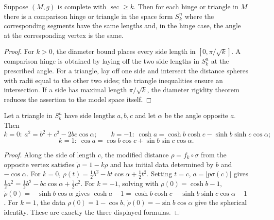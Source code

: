 \begin{lemma}
  \label{lem:pet-ch12-comparison-hinge-triangle-exist}

  Suppose $(M,g)$ is complete with $\sec\ge k$. Then for each hinge or triangle
  in $M$ there is a comparison hinge or triangle in the space form $S_k^n$ where
  the corresponding segments have the same lengths and, in the hinge case, the
  angle at the corresponding vertex is the same.
\end{lemma}
\begin{proof}
  \sketch
  For $k>0$, the diameter bound places every side length in
  $[0,\pi/\sqrt{k}]$. A comparison hinge is obtained by laying off the two side
  lengths in $S_k^n$ at the prescribed angle. For a triangle, lay off one side
  and intersect the distance spheres with radii equal to the other two sides;
  the triangle inequalities ensure an intersection. If a side has maximal
  length $\pi/\sqrt{k}$, the diameter rigidity theorem reduces the assertion to
  the model space itself.
\end{proof}

\begin{proposition}
  \label{prop:pet-ch12-law-of-cosines}

  Let a triangle in $S_k^n$ have side lengths $a,b,c$ and let $\alpha$ be the
  angle opposite $a$. Then
  \[
    k=0:\ a^2=b^2+c^2-2bc\cos\alpha;\qquad
    k=-1:\ \cosh a=\cosh b\cosh c-\sinh b\sinh c\cos\alpha;
  \]
  \[
    k=1:\ \cos a=\cos b\cos c+\sin b\sin c\cos\alpha.
  \]
\end{proposition}
\begin{proof}
  \sketch
  Along the side of length $c$, the modified distance $\rho=f_k\circ\sigma$
  from the opposite vertex satisfies $\ddot\rho=1-k\rho$ and has initial data
  determined by $b$ and $-\cos\alpha$. For $k=0$,
  $\rho(t)=\tfrac12b^2-b t\cos\alpha+\tfrac12t^2$. Setting $t=c$, $a=|p\sigma(c)|$
  gives $\tfrac12a^2=\tfrac12b^2-bc\cos\alpha+\tfrac12c^2$.
  For $k=-1$, solving with
  $\rho(0)=\cosh b-1$, $\dot\rho(0)=-\sinh b\cos\alpha$ gives
  $\cosh a-1=\cosh b\cosh c-\sinh b\sinh c\cos\alpha-1$.
  For $k=1$, the data
  $\rho(0)=1-\cos b$, $\dot\rho(0)=-\sin b\cos\alpha$ give the spherical
  identity. These are exactly the three displayed formulas.
\end{proof}

